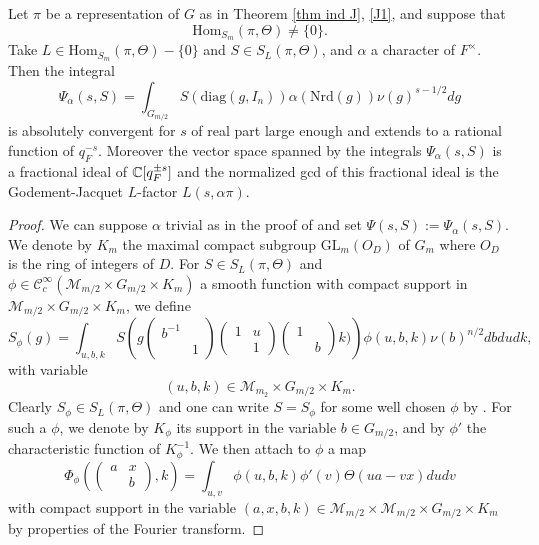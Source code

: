 \documentclass[11pt,letterpaper]{amsart}
\newcommand{\CM}{{\mathcal {M}}} \newcommand{\CN}{{\mathcal {N}}}\newcommand{\CO}{{\mathcal {O}}}\newcommand{\CP}{{\mathcal {P}}}
\newcommand{\GL}{{\mathrm {GL}}} \newcommand{\PGL}{{\mathrm {PGL}}}
\newcommand{\sm}{\mathcal{C}^{\infty}}
\newcommand{\Hom}{\mathrm{Hom}}
\newcommand{\nrd}{{\mathrm{Nrd}}}
\def\diag{\mathrm{diag}}
\theoremstyle{plain}
\numberwithin{equation}{section}
\begin{document}
\begin{prop}\label{prop FJ}
Let $\pi$ be a representation of $G$ as in Theorem \ref{thm ind J}, \eqref{J1}, and suppose that \[\Hom_{S_m}(\pi,\Theta)\neq \{0\}.\] Take $L\in \Hom_{S_m}(\pi,\Theta)-\{0\}$ and $S\in S_L(\pi,\Theta)$, and $\alpha$ a character of $F^\times$. Then the integral 
\[\Psi_{\alpha}(s,S)=\int_{G_{m/2}} S(\diag(g,I_n))\alpha(\nrd(g))\nu(g)^{s-1/2}dg\] is absolutely convergent for $s$ of real part large enough and extends to a rational function of $q_F^{-s}$. Moreover the vector space spanned by the integrals $\Psi_{\alpha}(s,S)$ is a fractional ideal of ${\mathbb {C}}[q_F^{\pm s}]$ and the normalized gcd of this fractional ideal is the Godement-Jacquet $L$-factor $L(s,\alpha \pi)$. 
\end{prop}
\begin{proof}
We can suppose $\alpha$ trivial as in the proof of \cite[Proposition 3.1]{FJ} and set $\Psi(s,S):=\Psi_{\alpha}(s,S)$. We denote by $K_m$ the maximal compact subgroup 
$\GL_m(O_D)$ of $G_m$ where $O_D$ is the ring of integers of $D$. For $S\in S_L(\pi,\Theta)$ and $\phi\in \sm_c(\CM_{m/2}\times G_{m/2} \times K_m)$ a smooth function with compact support in $\CM_{m/2}\times G_{m/2} \times K_m$, we define 
\[S_{\phi}(g)=\int_{u,b,k}S\left(g\begin{pmatrix} b^{-1} & \\ & 1\end{pmatrix}\begin{pmatrix} 1 & u \\ & 1\end{pmatrix}
\begin{pmatrix} 1 & \\ & b\end{pmatrix}k)\right)\phi(u,b,k)\nu(b)^{n/2}dbdudk,\] with variable 
\[(u,b,k)\in \CM_{m_2}\times G_{m/2}\times K_m.\]
Clearly $S_{\phi}\in  S_L(\pi,\Theta)$ and one can write $S=S_{\phi}$ for some well chosen $\phi$ by \cite[Lemma 4.2]{MatJNT}. 
For such a $\phi$, we denote by $K_{\phi}$ its support in the variable 
$b\in  G_{m/2}$, and by $\phi'$ the characteristic function of $K_{\phi}^{-1}$. We then attach to $\phi$ a map 
\[\Phi_{\phi}\left(\begin{pmatrix} a & x \\ & b \end{pmatrix}, k\right)= \int_{u,v}\phi(u,b,k)\phi'(v)\Theta(ua-vx)dudv\] with compact support in the variable $(a,x,b,k) \in \mathcal{M}_{m/2} \times \mathcal{M}_{m/2} \times G_{m/2} \times K_m$ by properties of the Fourier transform. 


\end{proof}
\end{document}
